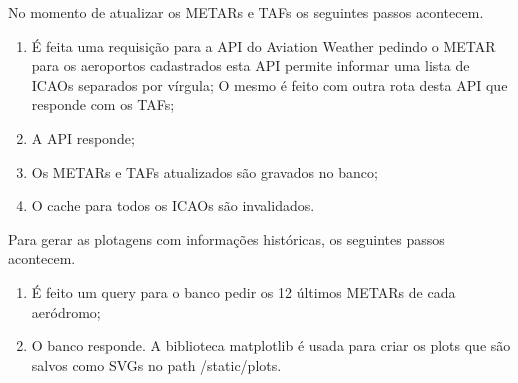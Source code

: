 No momento de atualizar os METARs e TAFs os seguintes passos acontecem.

\begin{enumerate}
\item É feita uma requisição para a API do Aviation Weather pedindo o METAR para os aeroportos
cadastrados esta API permite informar uma lista de ICAOs separados por vírgula;
O mesmo é feito com outra rota desta API que responde com os TAFs;
\item A API responde;
\item Os METARs e TAFs atualizados são gravados no banco;
\item O cache para todos os ICAOs são invalidados.
\end{enumerate}

Para gerar as plotagens com informações históricas, os seguintes passos acontecem.
\begin{enumerate}
    \item É feito um query para o banco pedir os 12 últimos METARs de cada aeródromo;
    \item O banco responde. A biblioteca matplotlib é usada para criar os plots que são salvos como SVGs 
    no path /static/plots.
\end{enumerate}